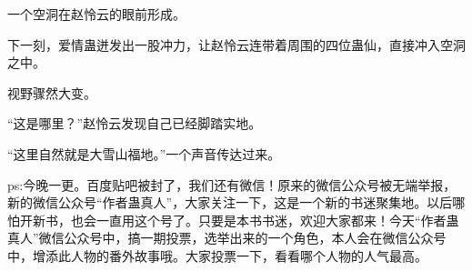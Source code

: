 \begin{this_body}
一个空洞在赵怜云的眼前形成。

下一刻，爱情蛊迸发出一股冲力，让赵怜云连带着周围的四位蛊仙，直接冲入空洞之中。

视野骤然大变。

“这是哪里？”赵怜云发现自己已经脚踏实地。

“这里自然就是大雪山福地。”一个声音传达过来。

ps:今晚一更。百度贴吧被封了，我们还有微信！原来的微信公众号被无端举报，新的微信公众号“作者蛊真人”，大家关注一下，这是一个新的书迷聚集地。以后哪怕开新书，也会一直用这个号了。只要是本书书迷，欢迎大家都来！今天“作者蛊真人”微信公众号中，搞一期投票，选举出来的一个角色，本人会在微信公众号中，增添此人物的番外故事哦。大家投票一下，看看哪个人物的人气最高。

\end{this_body}

